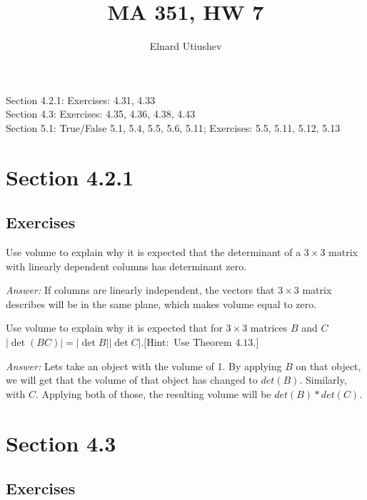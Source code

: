 \documentclass[letterpaper]{article}
\title{MA 351, HW 7}
\author{Elnard Utiushev}
\newcommand{\ans}{\textit{Answer: }}
\newenvironment{question}[2][Question]{\begin{trivlist}
\item[\hskip \labelsep {\bfseries #1}\hskip \labelsep {\bfseries #2.}]}{\end{trivlist}}
\begin{document}
\maketitle

Section 4.2.1: Exercises: 4.31, 4.33 \\ 
Section 4.3: Exercises: 4.35, 4.36, 4.38, 4.43 \\
Section 5.1: True/False 5.1, 5.4, 5.5, 5.6, 5.11; Exercises: 5.5, 5.11, 5.12, 5.13

\section{Section 4.2.1}
\subsection{Exercises}

\begin{question}{4.31}
  Use volume to explain why it is expected that the determinant of a \(3 \times 3\) matrix
  with linearly dependent columns has determinant zero.

  \ans If columns are linearly independent, the vectors that \(3 \times 3\) matrix 
  describes will be in the same plane, which makes volume equal to zero.
  
\end{question}

\begin{question}{4.33}
  Use volume to explain why it is expected that for \(3 \times 3\) matrices \(B\) and \(C \)
\(|\operatorname{det}(B C)|=|\operatorname{det} B||\operatorname{det} C| .[\)Hint\(:\) Use Theorem \(4.13 .] \)
  
  \ans Lets take an object with the volume of 1. By applying $B$ on that object, we 
  will get that the volume of that object has changed to $det(B)$. Similarly, with $C$.
  Applying both of those, the resulting volume will be $det(B) * det(C)$.
\end{question}

\section{Section 4.3}
\subsection{Exercises}
\end{document}
